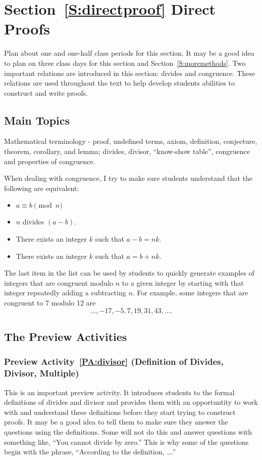 \section*{Section~\ref{S:directproof} Direct Proofs}
Plan about one and one-half class periods for this section.  It may be a good idea to plan on three class days for this section and Section~\ref{S:moremethods}.  Two important relations are introduced in this section:  divides and congruence.  These relations are used throughout the text to help develop students abilities to construct and write proofs.


\subsection*{Main Topics}
Mathematical terminology - proof, undefined terms, axiom, definition, conjecture, theorem, corollary, and lemma; divides, divisor, ``know-show table'', congruence and properties of congruence.

When dealing with congruence, I try to make sure students understand that the following are equivalent:
\begin{itemize}
\item $a \equiv b \pmod n$

\item $n$ divides $(a - b)$.

\item There exists an integer $k$ such that $a - b = nk$.

\item There exists an integer $k$ such that $a = b + nk$.
\end{itemize}
The last item in the list can be used by students to quickly generate examples of integers that are congruent modulo $n$ to a given integer by starting with that integer repeatedly adding a subtracting $n$.  For example, some integers that are congruent to 7 modulo 12 are
\[
\ldots, -17, -5, 7, 19, 31, 43, \ldots .
\]

\subsection*{The Preview Activities}
\subsubsection*{Preview Activity~\ref{PA:divisor} (Definition of Divides, Divisor, Multiple)} 
This is an important preview activity.  It introduces students to the formal definitions of divides and divisor and provides them with an opportuntity to work with and understand these definitions before they start trying to construct proofs.  It may be a good idea to tell them to make sure they answer the questions using the definitions.  Some will not do this and answer questions with something like, ``You cannot divide by zero.''  This is why some of the questions begin with the phrase, ``According to the definition, \ldots.''

